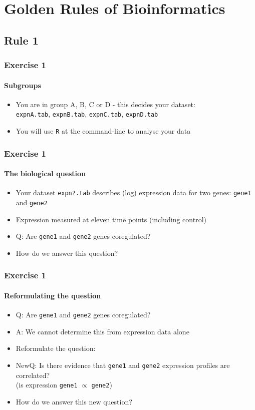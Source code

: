 \documentclass[table]{beamer}
\begin{document}
  \section{Golden Rules of Bioinformatics}
  
  \subsection{Rule 1}
  \begin{frame}
    \frametitle{Exercise 1}
    \framesubtitle{Subgroups}
    \begin{itemize}
      \item You are in group A, B, C or D - this decides your dataset: \\
      \texttt{expnA.tab}, \texttt{expnB.tab}, \texttt{expnC.tab}, \texttt{expnD.tab}
      \item You will use \texttt{R} at the command-line to analyse your data
    \end{itemize}
  \end{frame}
  
  \begin{frame}
    \frametitle{Exercise 1}
    \framesubtitle{The biological question}
    \begin{itemize}
      \item Your dataset \texttt{expn?.tab} describes (log) expression data for two genes: \texttt{gene1} and \texttt{gene2}
      \item Expression measured at eleven time points (including control)
      \item Q: Are \texttt{gene1} and \texttt{gene2} genes coregulated?
      \item How do we answer this question?
    \end{itemize}
  \end{frame}  

  \begin{frame}
    \frametitle{Exercise 1}
    \framesubtitle{Reformulating the question}
    \begin{itemize}
      \item<1-> Q: Are \texttt{gene1} and \texttt{gene2} genes coregulated?
      \item<1-> A: We cannot determine this from expression data alone
      \item<2-> Reformulate the question:
      \item<2-> NewQ: Is there evidence that \texttt{gene1} and \texttt{gene2} expression profiles are correlated? \\
            (is expression \texttt{gene1} $\propto$ \texttt{gene2})
      \item<2-> How do we answer this new question?
    \end{itemize}
  \end{frame}
\end{document}
